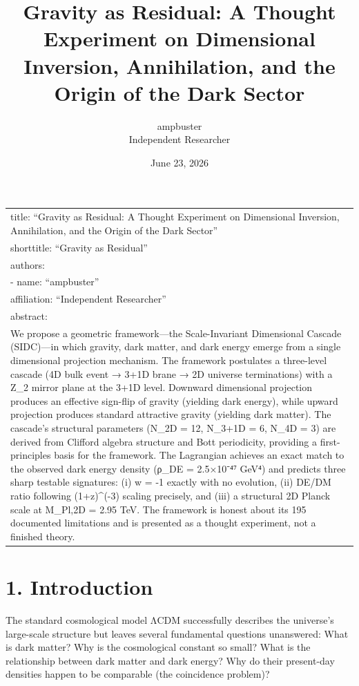 \documentclass[11pt,a4paper]{article}
\title{\textbf{Gravity as Residual: A Thought Experiment on Dimensional Inversion, Annihilation, and the Origin of the Dark Sector}}
\author{ampbuster \\ \small Independent Researcher}
\date{June 23, 2026}
\begin{document}
\maketitle
\begin{longtable}[]{@{}l@{}}
\toprule
\endhead
title: ``Gravity as Residual: A Thought Experiment on Dimensional
Inversion, Annihilation, and the Origin of the Dark Sector'' \\
shorttitle: ``Gravity as Residual'' \\
authors: \\
- name: ``ampbuster'' \\
affiliation: ``Independent Researcher'' \\
abstract: \textbar{} \\
We propose a geometric framework---the Scale-Invariant Dimensional
Cascade (SIDC)---in which gravity, dark matter, and dark energy emerge
from a single dimensional projection mechanism. The framework postulates
a three-level cascade (4D bulk event → 3+1D brane → 2D universe
terminations) with a Z\_2 mirror plane at the 3+1D level. Downward
dimensional projection produces an effective sign-flip of gravity
(yielding dark energy), while upward projection produces standard
attractive gravity (yielding dark matter). The cascade's structural
parameters (N\_2D = 12, N\_3+1D = 6, N\_4D = 3) are derived from
Clifford algebra structure and Bott periodicity, providing a
first-principles basis for the framework. The Lagrangian achieves an
exact match to the observed dark energy density (ρ\_DE = 2.5×10⁻⁴⁷ GeV⁴)
and predicts three sharp testable signatures: (i) w = -1 exactly with no
evolution, (ii) DE/DM ratio following (1+z)\^{}(-3) scaling precisely,
and (iii) a structural 2D Planck scale at M\_Pl,2D = 2.95 TeV. The
framework is honest about its 195 documented limitations and is
presented as a thought experiment, not a finished theory. \\
\bottomrule
\end{longtable}

\hypertarget{introduction}{%
\section{1. Introduction}\label{introduction}}

The standard cosmological model ΛCDM successfully describes the
universe's large-scale structure but leaves several fundamental
questions unanswered: What is dark matter? Why is the cosmological
constant so small? What is the relationship between dark matter and dark
energy? Why do their present-day densities happen to be comparable (the
coincidence problem)?
\end{document}
